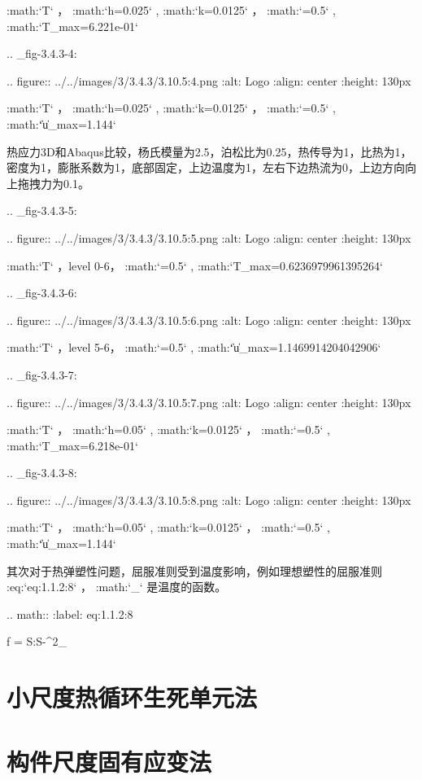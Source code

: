    :math:`T` ， :math:`h=0.025` , :math:`k=0.0125` ， :math:`=0.5` , :math:`T_{max}=6.221\mathrm e-01`
	   
.. _fig-3.4.3-4:

.. figure:: ../../images/3/3.4.3/3.10.5:4.png
   :alt: Logo
   :align: center
   :height: 130px

   :math:`T` ， :math:`h=0.025` , :math:`k=0.0125` ， :math:`=0.5` , :math:`\|\mathbf u\|_{max}=1.144`

热应力3D和Abaqus比较，杨氏模量为2.5，泊松比为0.25，热传导为1，比热为1，密度为1，膨胀系数为1，底部固定，上边温度为1，左右下边热流为0，上边方向向上拖拽力为0.1。  

.. _fig-3.4.3-5:

.. figure:: ../../images/3/3.4.3/3.10.5:5.png
   :alt: Logo
   :align: center
   :height: 130px
	    
   :math:`T` ，level 0-6， :math:`=0.5` , :math:`T_{max}=0.6236979961395264`

.. _fig-3.4.3-6:

.. figure:: ../../images/3/3.4.3/3.10.5:6.png
   :alt: Logo
   :align: center
   :height: 130px

   :math:`T` ，level 5-6， :math:`=0.5` , :math:`\|\mathbf u\|_{max}=1.1469914204042906`

.. _fig-3.4.3-7:

.. figure:: ../../images/3/3.4.3/3.10.5:7.png
   :alt: Logo
   :align: center
   :height: 130px

   :math:`T` ， :math:`h=0.05` , :math:`k=0.0125` ， :math:`=0.5` , :math:`T_{max}=6.218\mathrm e-01`
	   
.. _fig-3.4.3-8:

.. figure:: ../../images/3/3.4.3/3.10.5:8.png
   :alt: Logo
   :align: center
   :height: 130px

   :math:`T` ， :math:`h=0.05` , :math:`k=0.0125` ， :math:`=0.5` , :math:`\|\mathbf u\|_{max}=1.144`

其次对于热弹塑性问题，屈服准则受到温度影响，例如理想塑性的屈服准则 :eq:`eq:1.1.2:8` ， :math:`\sigma_\theta` 是温度的函数。

.. math::
   :label: eq:1.1.2:8
	   
   f = \mathbf S:\mathbf S-\sigma^2_\theta
\fi
\section{小尺度热循环生死单元法}

\section{构件尺度固有应变法}

